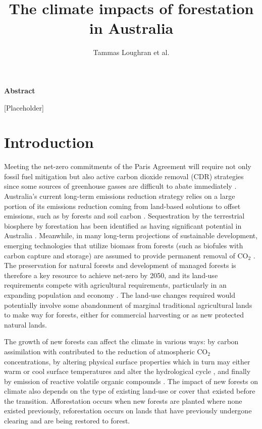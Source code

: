 \documentclass[]{article}
\title{The climate impacts of forestation in Australia}
\author{Tammas Loughran et al.}
\begin{document}
\maketitle

\begin{center}
    \Large
    \vspace{0.9cm}
    \textbf{Abstract}
\end{center}

[Placeholder]

\raggedright
\parindent=0.35in %

\section{Introduction}

Meeting the net-zero commitments of the Paris Agreement will require not only fossil fuel mitigation but also active carbon dioxide removal (CDR) strategies since some sources of greenhouse gasses are difficult to abate immediately \parencite{van_vuuren_rcp26_2011, vaughan_review_2011, rogelj_emission_2011}.
Australia's current long-term emissions reduction strategy relies on a large portion of its emissions reduction coming from land-based solutions to offset emissions, such as by forests and soil carbon \parencite{smith_longterm_2022, australian_government_2021}.
Sequestration by the terrestrial biosphere by forestation has been identified as having significant potential in Australia \parencite{fitch_australias_2022}.
Meanwhile, in many long-term projections of sustainable development, emerging technologies that utilize biomass from forests (such as biofules with carbon capture and storage) are assumed to provide permanent removal of CO$_2$ \parencite{pour_opportunities_2018}.
The preservation for natural forests and development of managed forests is therefore a key resource to achieve net-zero by 2050, and its land-use requirements compete with agricultural requirements, particularly in an expanding population and economy \parencite{fitch_australias_2022}.
The land-use changes required would potentially involve some abandonment of marginal traditional agricultural lands to make way for forests, either for commercial harvesting or as new protected natural lands.

The growth of new forests can affect the climate in various ways: by carbon assimilation with contributed to the reduction of atmospheric CO$_2$ concentrations, by altering physical surface properties which in turn may either warm or cool surface temperatures and alter the hydrological cycle \parencite{pongratz_biogeophysical_2010}, and finally by emission of reactive volatile organic compounds \parencite{weber_chemistry_albedo_2024}. The impact of new forests on climate also depends on the type of existing land-use or cover that existed before the transition. Afforestation occurs when new forests are planted where none existed previously, reforestation occurs on lands that have previously undergone clearing and are being restored to forest.
\end{document}
